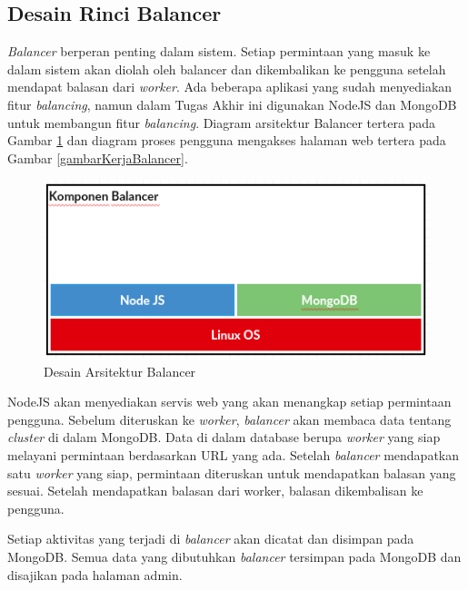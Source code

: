 \documentclass{ta-its}
\begin{document}
			
			\subsection{Desain Rinci Balancer}
			    \textit{Balancer} berperan penting dalam sistem. Setiap permintaan yang masuk ke dalam sistem akan diolah oleh balancer dan dikembalikan ke pengguna setelah mendapat balasan dari \textit{worker}. Ada beberapa aplikasi yang sudah menyediakan fitur \textit{balancing}, namun dalam Tugas Akhir ini digunakan NodeJS dan MongoDB untuk membangun fitur \textit{balancing}. Diagram arsitektur Balancer tertera pada Gambar \ref{gambarArsitekturBalancer} dan diagram proses pengguna mengakses halaman web tertera pada Gambar \ref{gambarKerjaBalancer}. 
			    
			    \begin{figure}[] %
			    	\centering
			    	\includegraphics[width=\linewidth]{contoh_img/kompbalancer}
			    	\caption{Desain Arsitektur Balancer}
			    	\label{gambarArsitekturBalancer}
			    \end{figure}
			    
			    NodeJS akan menyediakan servis web yang akan menangkap setiap permintaan pengguna. Sebelum diteruskan ke \textit{worker}, \textit{balancer} akan membaca data tentang \textit{cluster} di dalam MongoDB. Data di dalam database berupa \textit{worker} yang siap melayani permintaan berdasarkan URL yang ada. Setelah \textit{balancer} mendapatkan satu \textit{worker} yang siap, permintaan diteruskan untuk mendapatkan balasan yang sesuai. Setelah mendapatkan balasan dari worker, balasan dikembalisan ke pengguna.
			    
			    Setiap aktivitas yang terjadi di \textit{balancer} akan dicatat dan disimpan pada MongoDB. Semua data yang dibutuhkan \textit{balancer} tersimpan pada MongoDB dan disajikan pada halaman admin.
			    			    
\end{document}
